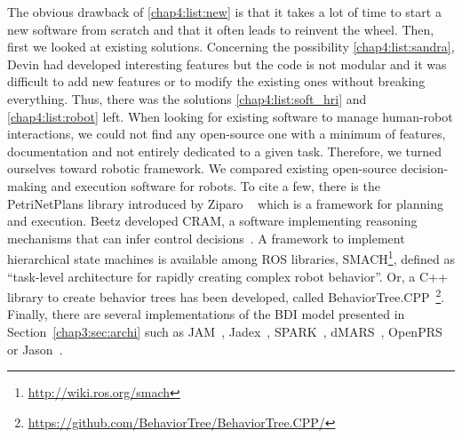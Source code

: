 \documentclass[a4paper,11pt,twoside]{StyleThese}
\begin{document}
The obvious drawback of \ref{chap4:list:new} is that it takes a lot of time to start a new software from scratch and that it often leads to reinvent the wheel. Then, first we looked at existing solutions. Concerning the possibility \ref{chap4:list:sandra}, Devin had developed interesting features but the code is not modular and it was difficult to add new features or to modify the existing ones without breaking everything. Thus, there was the solutions \ref{chap4:list:soft_hri} and \ref{chap4:list:robot} left. When looking for existing software to manage human-robot interactions, we could not find any open-source one with a minimum of features, documentation and not entirely dedicated to a given task. Therefore, we turned ourselves toward robotic framework. We compared existing open-source decision-making and execution software for robots. To cite a few, there is the PetriNetPlans library introduced by Ziparo \etal~\cite{ziparo_2011_petri} which is a framework for planning and execution. Beetz \etal{} developed CRAM, a software implementing reasoning mechanisms that can infer control decisions~\cite{beetz_2010_cram}. A framework to implement hierarchical state machines is available among ROS libraries, SMACH\footnote{\url{http://wiki.ros.org/smach}}, defined as ``task-level architecture for rapidly creating complex robot behavior''. Or, a C++ library to create behavior trees has been developed, called BehaviorTree.CPP~\footnote{\url{https://github.com/BehaviorTree/BehaviorTree.CPP/}}. Finally, there are several implementations of the BDI model presented in Section~\ref{chap3:sec:archi} such as JAM~\cite{huber_1999_jam}, Jadex~\cite{braudach_2005_jadex}, SPARK~\cite{morley_2004_spark}, dMARS~\cite{dinverno_1998_formal}, OpenPRS~\cite{ingrand_1996_prs} or Jason~\cite{bordini_2007_jason}. 
\end{document}
